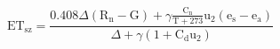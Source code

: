 \documentclass[12pt]{article}
\begin{document}
\begin{displaymath}
\mathrm{ET}_{\mathrm{sz}}=\frac{0.408 \Delta\left(\mathrm{R}_{\mathrm{n}}-\mathrm{G}\right)+\gamma \frac{\mathrm{C}_{\mathrm{n}}}{\mathrm{T}+273} \mathrm{u}_{2}\left(\mathrm{e}_{\mathrm{s}}-\mathrm{e}_{\mathrm{a}}\right)}{\Delta+\gamma\left(1+\mathrm{C}_{\mathrm{d}} \mathrm{u}_{2}\right)}
\end{displaymath}
\end{document}
